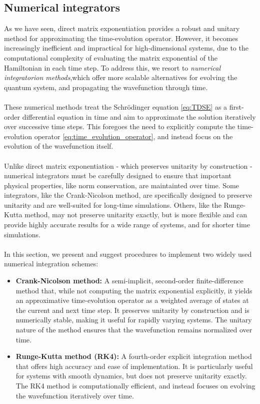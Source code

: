 \documentclass{subfiles}
\begin{document}
\subsection{Numerical integrators}
As we have seen, direct matrix exponentiation provides a robust and unitary method for approximating the time-evolution operator. However, it becomes increasingly inefficient and impractical for high-dimensional systems, due to the computational complexity of evaluating the matrix exponential of the Hamiltonian in each time step. To address this, we resort to \emph{numerical integratorion methods},which offer more scalable alternatives for evolving the quantum system, and propagating the wavefunction through time.  \\\\ These numerical methods treat the Schrödinger equation \eqref{eq:TDSE} as a first-order differential equation in time and aim to approximate the solution iteratively over successive time steps. This foregoes the need to explicitly compute the time-evolution operator \eqref{eq:time_evolution_operator}, and instead focus on the evolution of the wavefunction itself. \\\\ 


Unlike direct matrix exponentiation - which preserves unitarity by construction - numerical integrators must be carefully designed to ensure that important physical properties, like norm conservation, are maintainted over time. Some integrators, like the Crank-Nicolson method, are specifically designed to preserve unitarity and are well-suited for long-time simulations. Others, like the Runge-Kutta method, may not preserve unitarity exactly, but is more flexible and can provide highly accurate results for a wide range of systems, and for shorter time simulations. \\ \\ In this section, we present and suggest procedures to implement two widely used numerical integration schemes:
\begin{itemize}
    \item \textbf{Crank-Nicolson method:} A semi-implicit, second-order finite-difference method that, while not computing the matrix exponential explicitly, it yields an approximative time-evolution operator as a weighted average of states at the current and next time step. It preserves unitarity by construction and is numerically stable, making it useful for rapidly varying systems. The unitary nature of the method ensures that the wavefunction remains normalized over time.
    \item \textbf{Runge-Kutta method (RK4):} A fourth-order explicit integration method that offers high accuracy and ease of implementation. It is particularly useful for systems with smooth dynamics, but does not preserve unitarity exactly. The RK4 method is computationally efficient, and instead focuses on evolving the wavefunction iteratively over time.
\end{itemize}
\end{document}

